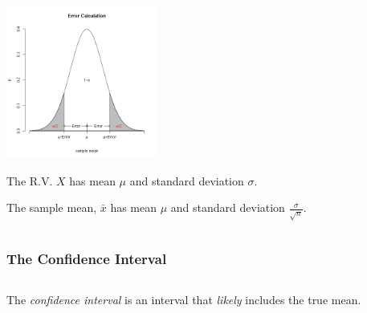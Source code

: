 \begin{frame}

  \begin{columns}[T]

    \begin{column}[T]{0.5\textwidth}
      \centerline{\includegraphics[width=5cm]{img/confidenceInterval}}
      The R.V. $X$ has mean $\mu$ and standard deviation $\sigma$.

      The sample mean, $\bar{x}$ has mean $\mu$ and standard deviation
      $\frac{\sigma}{\sqrt{n}}$.

    \end{column}


  \end{columns}


\end{frame}



\begin{frame}
  \frametitle{The Confidence Interval}

  \begin{columns}
    \begin{definition}
      The \textit{\color{red}confidence interval} is an interval that \textit{\color{red}likely}
      includes the true mean.
    \end{definition}


    

  \end{columns}

\end{frame}

